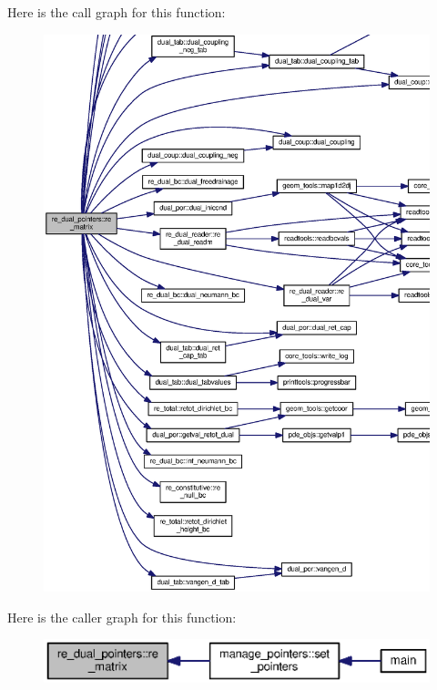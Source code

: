 Here is the call graph for this function\+:
\nopagebreak
\begin{figure}[H]
\begin{center}
\leavevmode
\includegraphics[width=350pt]{namespacere__dual__pointers_aa76c31f626d7323a2032a80d6cac5ff6_cgraph}
\end{center}
\end{figure}




Here is the caller graph for this function\+:\nopagebreak
\begin{figure}[H]
\begin{center}
\leavevmode
\includegraphics[width=350pt]{namespacere__dual__pointers_aa76c31f626d7323a2032a80d6cac5ff6_icgraph}
\end{center}
\end{figure}


